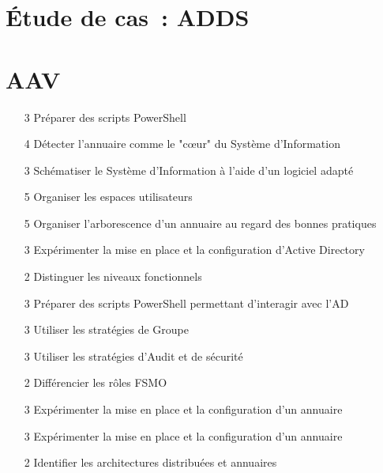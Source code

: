 \newpage
\section*{Étude de cas~: ADDS}

\section*{AAV}
\begin{itemize}
	\item [3] Préparer des scripts PowerShell
    \item [4] Détecter l'annuaire comme le "cœur" du Système d'Information
    \item [3] Schématiser le Système d'Information à l'aide d'un logiciel adapté
    \item [5] Organiser les espaces utilisateurs
    \item [5] Organiser l'arborescence d'un annuaire au regard des bonnes pratiques
    \item [3] Expérimenter la mise en place et la configuration d'Active Directory
    \item [2] Distinguer les niveaux fonctionnels
    \item [3] Préparer des scripts PowerShell permettant d'interagir avec l'AD
    \item [3] Utiliser les stratégies de Groupe
    \item [3] Utiliser les stratégies d'Audit et de sécurité
    \item [2] Différencier les rôles FSMO
    \item [3] Expérimenter la mise en place et la configuration d'un annuaire
    \item [3] Expérimenter la mise en place et la configuration d'un annuaire
    \item [2] Identifier les architectures distribuées et annuaires
\end{itemize}

\newpage

